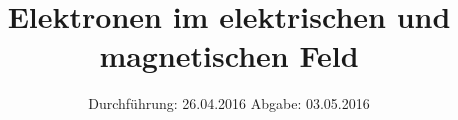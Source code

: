 
\subject{501/502}
\title{Elektronen im elektrischen und magnetischen Feld}
\date{
  Durchführung: 26.04.2016
  \hspace{3em}
  Abgabe: 03.05.2016
}



\maketitle
\newpage
\mbox{}
\newpage
\thispagestyle{empty}
\tableofcontents
\newpage






\nocite{numpy}
\nocite{matplotlib}
\nocite{uncertainties}
\printbibliography


